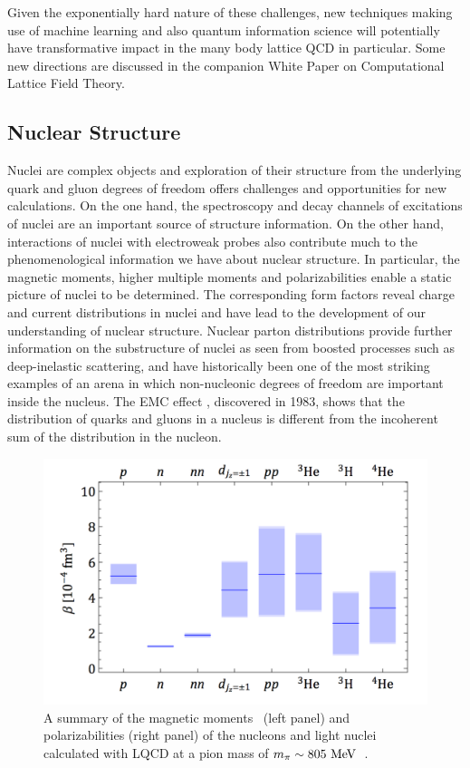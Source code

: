 Given the exponentially hard nature of these challenges, new techniques making use of machine learning \cite{Shanahan:2018vcv} and also quantum information science will potentially have transformative  impact 
in the many body lattice QCD in particular. Some new directions are discussed in the companion White Paper on Computational Lattice Field Theory.


\subsection{Nuclear Structure}
\label{sec:nuclearstructure}

Nuclei are complex objects and exploration of their structure from the underlying quark and gluon degrees of freedom offers challenges and opportunities for new calculations. On the one hand, the spectroscopy and decay channels of excitations of nuclei are an important source of structure information. On the other hand, interactions of nuclei with electroweak probes also contribute much to the phenomenological information we have about nuclear structure. 
In particular, the magnetic moments,  higher multiple moments and polarizabilities  enable a static picture of nuclei to be determined. The corresponding form factors reveal charge and current distributions in nuclei and  have lead to the 
development of our understanding of nuclear structure. 
Nuclear parton distributions provide further information on the substructure of nuclei as seen from boosted processes such as deep-inelastic scattering, and have historically been one of the 
most striking examples of an arena in which non-nucleonic degrees of freedom are important inside the nucleus. The EMC effect \cite{Aubert:1983XX}, discovered in 1983, shows that the distribution of quarks and gluons in a nucleus is different from the incoherent sum of the distribution in the nucleon.

%
\begin{figure}[!t]
	\centering
	\includegraphics[width=0.49\columnwidth]{figures/PhysPols.pdf}
	\caption{ 
		A summary of the magnetic moments~\protect\cite{Beane:2014ora} (left panel) and polarizabilities (right panel) of the nucleons and
		light nuclei calculated with LQCD at a pion mass of
		$m_\pi\sim 805~{\rm MeV}$~\protect\cite{Chang:2015qxa}.    }
	\label{fig:summaryBETA}
\end{figure}

